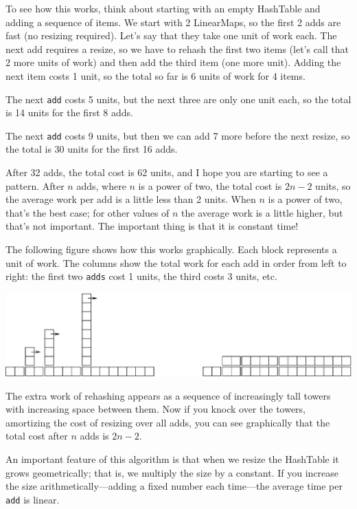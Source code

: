 \documentclass[10pt]{book}
\begin{document}
To see how this works, think about starting with an empty
HashTable and adding a sequence of items.  We start with 2 LinearMaps,
so the first 2 adds are fast (no resizing required).  Let's
say that they take one unit of work each.  The next add
requires a resize, so we have to rehash the first two
items (let's call that 2 more units of work) and then
add the third item (one more unit).  Adding the next item
costs 1 unit, so the total so far is
6 units of work for 4 items.

The next {\tt add} costs 5 units, but the next three
are only one unit each, so the total is 14 units for the
first 8 adds.

The next {\tt add} costs 9 units, but then we can add 7 more
before the next resize, so the total is 30 units for the
first 16 adds.

After 32 adds, the total cost is 62 units, and I hope you are starting
to see a pattern.  After $n$ adds, where $n$ is a power of two, the
total cost is $2n - 2$ units, so the average work per add is
a little less than 2 units.  When $n$ is a power of two, that's
the best case; for other values of $n$ the average work is a little
higher, but that's not important.  The important thing is that it
is constant time!

The following figure shows how this works graphically.  Each
block represents a unit of work.  The columns show the total
work for each add in order from left to right: the first two
{\tt adds} cost 1 units, the third costs 3 units, etc.

\beforefig
\centerline{\includegraphics[width=5.5in]{figs/towers.eps}}
\afterfig

The extra work of rehashing appears as a sequence of increasingly
tall towers with increasing space between them.  Now if you knock
over the towers, amortizing the cost of resizing over all
adds, you can see graphically that the total cost after $n$
adds is $2n - 2$.

An important feature of this algorithm is that when we resize the
HashTable it grows geometrically; that is, we multiply the size by a
constant.  If you increase the size
arithmetically---adding a fixed number each time---the average time
per {\tt add} is linear.
\end{document}
